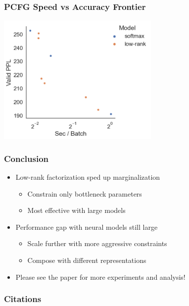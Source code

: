\documentclass{beamer}
\begin{document}
\begin{frame}
\frametitle{PCFG Speed vs Accuracy Frontier}
\centering
\includegraphics[height=2.5in]{imgs/hmm/pcfg-speed-accuracy.png}
\end{frame}

\begin{frame}
\frametitle{Conclusion}
\begin{itemize}
\item Low-rank factorization sped up marginalization
    \begin{itemize}
    \item Constrain only bottleneck parameters
    \item Most effective with large models
    \end{itemize}
\vspace{1em}
\item Performance gap with neural models still large
    \begin{itemize}
    \item Scale further with more aggressive constraints
    \item Compose with different representations
    \end{itemize}
\vspace{1em}
\item Please see the paper for more experiments and analysis!
\end{itemize}
\end{frame}


\begin{frame}[allowframebreaks]
\frametitle{Citations}
\printbibliography
\end{frame}
\end{document}
